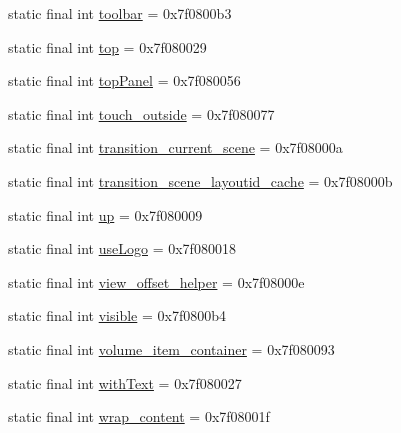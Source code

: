 \begin{CompactItemize}
\item 
static final int \hyperlink{classandroid_1_1support_1_1graphics_1_1drawable_1_1_r_1_1id_7b5576da6cda63aa7b986a8c4d254727}{toolbar} = 0x7f0800b3
\item 
static final int \hyperlink{classandroid_1_1support_1_1graphics_1_1drawable_1_1_r_1_1id_ac3970c0422217f537228f46443d9d9d}{top} = 0x7f080029
\item 
static final int \hyperlink{classandroid_1_1support_1_1graphics_1_1drawable_1_1_r_1_1id_d1197466e1a805eb706bbcffba9e688d}{topPanel} = 0x7f080056
\item 
static final int \hyperlink{classandroid_1_1support_1_1graphics_1_1drawable_1_1_r_1_1id_3ae3a037e41e584121d47d5130828dda}{touch\_\-outside} = 0x7f080077
\item 
static final int \hyperlink{classandroid_1_1support_1_1graphics_1_1drawable_1_1_r_1_1id_3abb74be402aca9aa6a24647a57b555d}{transition\_\-current\_\-scene} = 0x7f08000a
\item 
static final int \hyperlink{classandroid_1_1support_1_1graphics_1_1drawable_1_1_r_1_1id_439164a77dd8f00009561da761463455}{transition\_\-scene\_\-layoutid\_\-cache} = 0x7f08000b
\item 
static final int \hyperlink{classandroid_1_1support_1_1graphics_1_1drawable_1_1_r_1_1id_33dbd54841c3249d3d2b1a6db81da22d}{up} = 0x7f080009
\item 
static final int \hyperlink{classandroid_1_1support_1_1graphics_1_1drawable_1_1_r_1_1id_03ae20d8767897a4d5aa456c410b19d8}{useLogo} = 0x7f080018
\item 
static final int \hyperlink{classandroid_1_1support_1_1graphics_1_1drawable_1_1_r_1_1id_55770028aeb40eec7d289268078797ca}{view\_\-offset\_\-helper} = 0x7f08000e
\item 
static final int \hyperlink{classandroid_1_1support_1_1graphics_1_1drawable_1_1_r_1_1id_652aa11057ce4dd69972cd092657eb1a}{visible} = 0x7f0800b4
\item 
static final int \hyperlink{classandroid_1_1support_1_1graphics_1_1drawable_1_1_r_1_1id_e56c2981b490374a6cebb0ff06ca8ceb}{volume\_\-item\_\-container} = 0x7f080093
\item 
static final int \hyperlink{classandroid_1_1support_1_1graphics_1_1drawable_1_1_r_1_1id_f2da1c9a65ec68a9690f082d1d7062b5}{withText} = 0x7f080027
\item 
static final int \hyperlink{classandroid_1_1support_1_1graphics_1_1drawable_1_1_r_1_1id_c367459aeafa1976a6fbc626752b8121}{wrap\_\-content} = 0x7f08001f
\end{CompactItemize}


